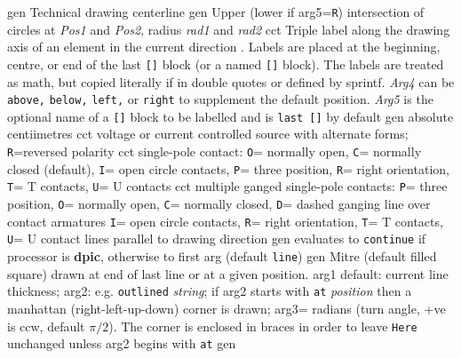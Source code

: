   {gen}
  {Technical drawing centerline}
  {gen}
  {Upper (lower if arg5={\tt R}) intersection of circles at
    {\sl Pos1} and {\sl Pos2}, radius {\sl rad1} and {\sl rad2}}
  {cct}
  {Triple label along the drawing axis of an element in the current
    direction .  Labels are placed at the beginning,
    centre, or end of the last {\tt []} block (or a named {\tt []}
    block). The labels are treated as math, but copied literally if
    in double quotes or defined by sprintf.  {\sl Arg4} can be {\tt
    above,} {\tt below,} {\tt left,} or {\tt right} to supplement the
    default position.  {\sl Arg5} is the optional name of a {\tt []}
    block to be labelled and is {\tt last []} by default}
  {gen}
  {absolute centiimetres}
  {cct}
  {voltage or current controlled source with alternate forms;
   {\tt R}=reversed polarity}
  {cct}
  {single-pole contact:
   {\tt O}= normally open,
   {\tt C}= normally closed (default),
   {\tt I}= open circle contacts,
   {\tt P}= three position,
   {\tt R}= right orientation,
   {\tt T}= T contacts,
   {\tt U}= U contacts
   }
  {cct}
  {multiple ganged single-pole contacts:
   {\tt P}= three position,
   {\tt O}= normally open,
   {\tt C}= normally closed,
   {\tt D}= dashed ganging line over contact armatures
   {\tt I}= open circle contacts,
   {\tt R}= right orientation,
   {\tt T}= T contacts,
   {\tt U}= U contact lines parallel to drawing direction
   }
  {gen}
  {evaluates to {\tt continue}
    if processor is {\bf dpic}, otherwise to first arg (default {\tt line})}
  {gen}
  { Mitre (default filled square) drawn at end of last line or at a
    given position.
    arg1 default: current line thickness;
    arg2: e.g. {\tt outlined} {\sl string}; if arg2 starts with
    {\tt at} {\sl position} then a manhattan (right-left-up-down) corner
    is drawn;
    arg3= radians (turn angle, +ve is ccw, default $\pi/2$).
    The corner is enclosed in braces
    in order to leave {\tt Here} unchanged unless arg2 begins with {\tt at}
    }
  {gen}
